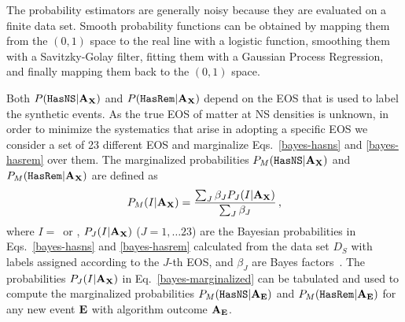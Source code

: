The probability estimators are generally noisy because they are evaluated on a finite data set. Smooth probability functions can be obtained by mapping them from the $(0,1)$ space to the real
line with a logistic function, smoothing them with a Savitzky-Golay filter, fitting them with a Gaussian Process Regression, and finally mapping them back to the $(0,1)$ space.   

Both $P({{\tt HasNS}}|{\bf A}_{\bf X})$ and $P({{\tt HasRem}}|{\bf A}_{\bf X})$ depend on the \ac{EOS} that is used to label the synthetic events. As the true \ac{EOS} of matter at \ac{NS} densities is unknown, in order to minimize the systematics that arise in adopting a specific \ac{EOS} we consider a set of 23 different \ac{EOS} and marginalize Eqs.~\eqref{bayes-hasns} and \eqref{bayes-hasrem} over them. The marginalized probabilities $P_M({{\tt HasNS}}|{\bf A}_{\bf X})$ and $P_M({{\tt HasRem}}|{\bf A}_{\bf X})$ are defined as
%
\begin{equation}
\begin{aligned}
P_M(I|{\bf A}_{\bf X})=\frac{\sum_J\beta_J P_J(I|{\bf A}_{\bf X})}{\sum_J\beta_J}\,,
\label{bayes-marginalized}
\end{aligned}
\end{equation}
%
where $I=$\hasns\ or \hasrem, $P_J(I|{\bf A}_{\bf X})$ ($J=1,\dots 23$) are the Bayesian probabilities in Eqs.~\eqref{bayes-hasns} and \eqref{bayes-hasrem} calculated from the data set $D_S$ with labels assigned according to the $J$-th \ac{EOS}, and $\beta_J$ are Bayes factors~\cite{Ghosh:2021eqv}. The probabilities $P_J(I|{\bf A}_{\bf X})$ in Eq.~\eqref{bayes-marginalized} can be tabulated and used to compute the marginalized probabilities $P_M({{\tt HasNS}}|{\bf A}_{\bf E})$ and $P_M({{\tt HasRem}}|{\bf A}_{\bf E})$ for any new event $\bf E$ with algorithm outcome $\bf A_{E}$.
